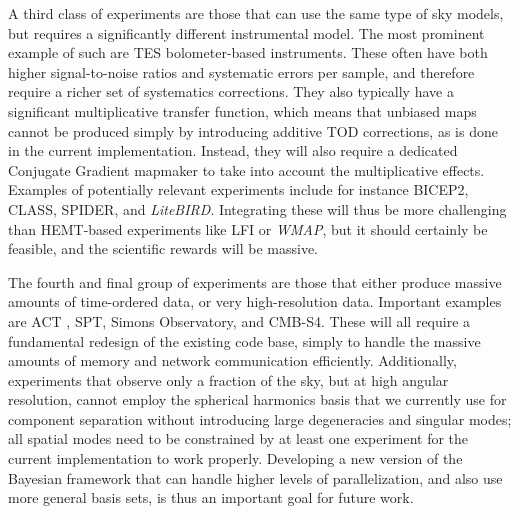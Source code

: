 \documentclass[onecolumn]{aa}
\def\WMAP{\emph{WMAP}}
\begin{document}
A third class of experiments are those that can use the same type of
sky models, but requires a significantly different instrumental
model. The most prominent example of such are TES bolometer-based
instruments. These often have both higher signal-to-noise ratios and
systematic errors per sample, and therefore require a richer set of
systematics corrections. They also typically have a significant
multiplicative transfer function, which means that unbiased maps
cannot be produced simply by introducing additive TOD corrections, as
is done in the current implementation.  Instead, they will also require
a dedicated Conjugate Gradient mapmaker to take into account the
multiplicative effects. Examples of potentially relevant experiments
include for instance BICEP2, CLASS, SPIDER, and \emph{LiteBIRD}. Integrating
these will thus be more challenging than HEMT-based experiments like
LFI or \WMAP, but it should certainly be feasible, and the scientific
rewards will be massive.

The fourth and final group of experiments are those that either
produce massive amounts of time-ordered data, or very high-resolution
data. Important examples are ACT , SPT, Simons Observatory, and CMB-S4. 
These will all require a fundamental redesign of the existing
code base, simply to handle the massive amounts of
memory and network communication efficiently. Additionally,
experiments that observe only a fraction of the sky, but at high
angular resolution, cannot employ the spherical harmonics basis that
we currently use for component separation without introducing large
degeneracies and singular modes; all spatial modes need to be
constrained by at least one experiment for the current implementation
to work properly. Developing a new version of the Bayesian framework
that can handle higher levels of parallelization, and also use more
general basis sets, is thus an important goal for future work.
\end{document}

